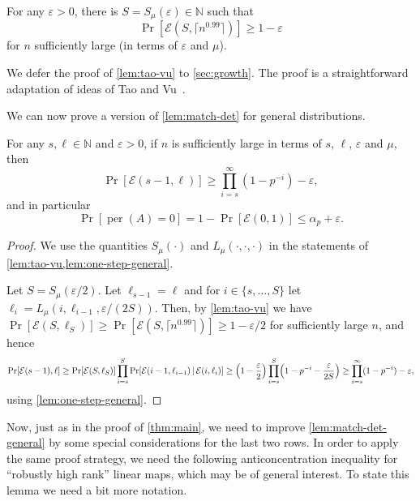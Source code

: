 \documentclass[10pt,reqno]{amsart}
\let\originalleft\left
\let\originalright\right
\renewcommand{\left}{\mathopen{}\mathclose\bgroup\originalleft}
\renewcommand{\right}{\aftergroup\egroup\originalright}
\numberwithin{equation}{section}
\theoremstyle{remark}
\newcommand{\mb}{\mathbb}
\newcommand{\mc}{\mathcal}
\newcommand{\on}{\operatorname}
\begin{document}
\begin{lemma}\label{lem:tao-vu}
For any $\varepsilon>0$, there is $S=S_\mu(\varepsilon)\in \mb N$  such that \[\Pr[\mc E(S,\lceil n^{0.99}\rceil)]\ge 1-\varepsilon\]for $n$ sufficiently large (in terms of $\varepsilon$ and $\mu$).%
\end{lemma}
We defer the proof of \cref{lem:tao-vu} to \cref{sec:growth}. The proof is a straightforward adaptation of ideas of Tao and Vu~\cite{TV09}.

We can now prove a version of \cref{lem:match-det} for  general distributions.

\begin{corollary}
\label{lem:match-det-general}For any $s,\ell\in \mb N$ and $\varepsilon>0$, if $n$ is sufficiently large in terms of $s$, $\ell$, $\varepsilon$ and $\mu$, then
\[
\Pr[\mathcal{E}(s-1,\ell)]\ge\prod_{i=s}^{\infty}(1-p^{-i})-\varepsilon,
\]
and in particular 
\[
\Pr[\on{per}(A)=0]=1-\Pr[\mathcal{E}(0,1)]\le\alpha_{p}+\varepsilon.
\]
\end{corollary}
\begin{proof}
We use the quantities $S_\mu(\cdot)$ and $L_\mu(\cdot,\cdot,\cdot)$ in the statements of \cref{lem:tao-vu,lem:one-step-general}.

    Let $S=S_\mu(\varepsilon/2)$. Let $\ell_{s-1}=\ell$ and for $i\in \{s,\dots,S\}$ let $\ell_i=L_\mu(i,\ell_{i-1},\varepsilon/(2S))$. Then, by \cref{lem:tao-vu} we have $\Pr[\mc E(S,\ell_S)]\ge \Pr[\mc E(S,\lceil n^{0.99}\rceil)]\ge 1-\varepsilon/2$ for sufficiently large $n$, and hence
    \[
\Pr[\mathcal{E}(s-1),\ell]\ge \Pr[\mc E(S,\ell_S)]\prod_{i=s}^{S}\Pr[\mathcal{E}(i-1,\ell_{i-1})\,|\,\mathcal{E}(i,\ell_{i})]\ge\left(1-\frac \varepsilon 2\right)\prod_{i=s}^{S}\left(1-p^{-i}-\frac{\varepsilon}{2S}\right)\ge \prod_{i=s}^{\infty}(1-p^{-i})-\varepsilon,
\]
using \cref{lem:one-step-general}.%
\end{proof}


Now, just as in the proof of \cref{thm:main}, we need to improve \cref{lem:match-det-general} by some special considerations for the last two rows. In order to apply the same proof strategy, we need the following anticoncentration inequality for ``robustly high rank'' linear maps, which may be of general interest. To state this lemma we need a bit more notation.
\end{document}
